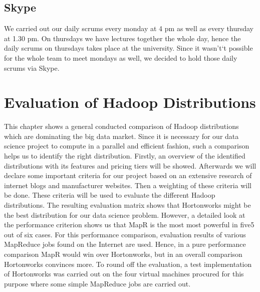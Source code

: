 \documentclass[12pt]{article}
\begin{document}
\subsection{Skype}
We carried out our daily scrums every monday at 4 pm as well as every thursday at 1.30 pm. On thursdays we have lectures together the whole day, hence the daily scrums on thursdays takes place at the university. Since it wasn't`t possible for the whole team to meet mondays as well, we decided to hold those daily scrums via Skype.
\section{Evaluation of Hadoop Distributions}
This chapter shows a general conducted comparison of Hadoop distributions which are dominating the big
data market. Since it is necessary for our data science project to compute in a parallel and efficient fashion, such a comparison helps us to identify the right distribution. Firstly, an overview of the identified distributions with its features and pricing tiers will be showed. Afterwards we will declare some important criteria for our project based on an extensive research of internet blogs and manufacturer websites. Then a weighting of these criteria will be done. These criteria will be used to evaluate the different Hadoop distributions. The resulting evaluation matrix shows that Hortonworks might be the best distribution for our data science problem. However, a detailed look at the performance criterion shows us that MapR is the most most powerful in five5 out of six cases. For this performance comparison, evaluation results of various MapReduce jobs found on the Internet are used. Hence, in a pure performance comparison MapR would win over Hortonworks, but in an overall comparison Hortonworks convinces more. To round off the
evaluation, a test implementation of Hortonworks was carried out on the four virtual machines procured for
this purpose where some simple MapReduce jobs are carried out.
\end{document}
